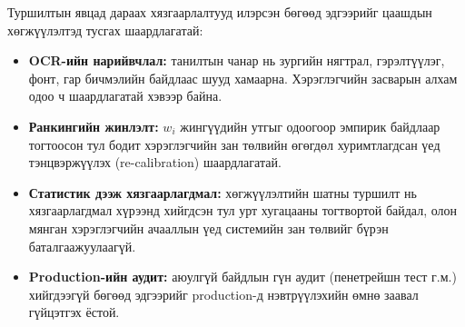 Туршилтын явцад дараах хязгаарлалтууд илэрсэн бөгөөд эдгээрийг цаашдын хөгжүүлэлтэд тусгах шаардлагатай:

\begin{itemize}[leftmargin=2em]
    \item \textbf{OCR-ийн нарийвчлал:} танилтын чанар нь зургийн нягтрал, гэрэлтүүлэг, фонт, гар бичмэлийн байдлаас шууд хамаарна. Хэрэглэгчийн засварын алхам одоо ч шаардлагатай хэвээр байна.
    \item \textbf{Ранкингийн жинлэлт:} $w_i$ жингүүдийн утгыг одоогоор эмпирик байдлаар тогтоосон тул бодит хэрэглэгчийн зан төлвийн өгөгдөл хуримтлагдсан үед тэнцвэржүүлэх (re-calibration) шаардлагатай.
    \item \textbf{Статистик дээж хязгаарлагдмал:} хөгжүүлэлтийн шатны туршилт нь хязгаарлагдмал хүрээнд хийгдсэн тул урт хугацааны тогтвортой байдал, олон мянган хэрэглэгчийн ачааллын үед системийн зан төлвийг бүрэн баталгаажуулаагүй.
    \item \textbf{Production-ийн аудит:} аюулгүй байдлын гүн аудит (пенетрейшн тест г.м.) хийгдээгүй бөгөөд эдгээрийг production-д нэвтрүүлэхийн өмнө заавал гүйцэтгэх ёстой.
\end{itemize}
